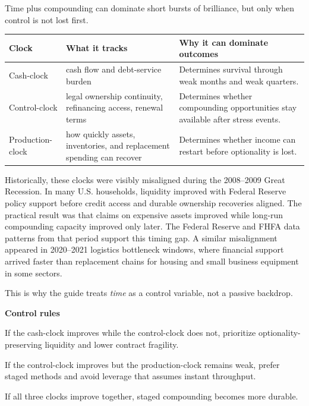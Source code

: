 \documentclass[11pt,openany]{book}
\begin{document}
Time plus compounding can dominate short bursts of brilliance, but only when control is not lost first.

\begin{center}
\small
\begin{tabularx}{\textwidth}{>{\raggedright\arraybackslash}p{}>{\raggedright\arraybackslash}p{}>{\raggedright\arraybackslash}p{}}
\toprule
\textbf{Clock} & \textbf{What it tracks} & \textbf{Why it can dominate outcomes} \\
\midrule
Cash-clock & cash flow and debt-service burden & Determines survival through weak months and weak quarters. \\
Control-clock & legal ownership continuity, refinancing access, renewal terms & Determines whether compounding opportunities stay available after stress events. \\
Production-clock & how quickly assets, inventories, and replacement spending can recover & Determines whether income can restart before optionality is lost. \\
\bottomrule
\end{tabularx}
\normalsize
\end{center}

Historically, these clocks were visibly misaligned during the 2008--2009 Great Recession. In many U.S. households, liquidity improved with Federal Reserve policy support before credit access and durable ownership recoveries aligned. The practical result was that claims on expensive assets improved while long-run compounding capacity improved only later. The Federal Reserve and FHFA data patterns from that period support this timing gap. A similar misalignment appeared in 2020--2021 logistics bottleneck windows, where financial support arrived faster than replacement chains for housing and small business equipment in some sectors.

This is why the guide treats \textit{time} as a control variable, not a passive backdrop.

\begin{signalbox}
\textbf{Control rules}\par
If the cash-clock improves while the control-clock does not, prioritize optionality-preserving liquidity and lower contract fragility.\par
If the control-clock improves but the production-clock remains weak, prefer staged methods and avoid leverage that assumes instant throughput.\par
If all three clocks improve together, staged compounding becomes more durable.
\end{signalbox}
\end{document}
